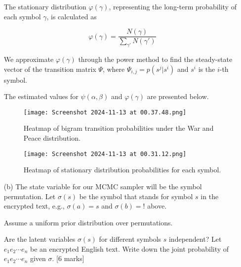 \documentclass{article}
\begin{document}
\begin{enumerate}
    \vspace{0.8em}
    
    The stationary distribution \( \varphi(\gamma) \), representing the long-term probability of each symbol \( \gamma \), is calculated as
    
    \begin{equation}
    \varphi(\gamma) = \frac{N(\gamma)}{\sum_{\gamma'} N(\gamma')}
    \end{equation}

    \vspace{0.8em}

    
    We approximate \( \varphi(\gamma) \) through the power method to find the steady-state vector of the transition matrix \( \Psi \), where \( \Psi_{i,j} = p(s^j | s^i) \) and \( s^i \) is the \( i \)-th symbol.

    \vspace{0.8em}
    
    The estimated values for \( \psi(\alpha, \beta) \) and \( \varphi(\gamma) \) are presented below.

    \begin{figure}[H]
        \centering
        \texttt{[image: Screenshot 2024-11-13 at 00.37.48.png]}
        \caption{Heatmap of bigram transition probabilities under the War and Peace distribution.}
        \label{fig:enter-label}
    \end{figure}

    \begin{figure}[H]
        \centering
        \texttt{[image: Screenshot 2024-11-13 at 00.31.12.png]}
        \caption{Heatmap of stationary distribution probabilities for each symbol.}
        \label{fig:enter-label}
    \end{figure}

    \vspace{10pt}
    
    \item[(b)] The state variable for our MCMC sampler will be the symbol permutation. Let \( \sigma(s) \) be the symbol that stands for symbol \( s \) in the encrypted text, e.g., \( \sigma(a) = s \) and \( \sigma(b) = ! \) above.
    
    Assume a uniform prior distribution over permutations.
    
    Are the latent variables \( \sigma(s) \) for different symbols \( s \) independent? Let \( e_1 e_2 \cdots e_n \) be an encrypted English text. Write down the joint probability of \( e_1 e_2 \cdots e_n \) given \( \sigma \). [6 marks]


\end{enumerate}
\end{document}
